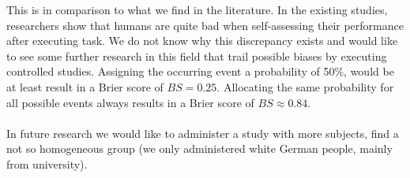 \documentclass[../main/main.tex]{subfiles}
\begin{document}
	This is in comparison to what we find in the literature. In the existing studies, researchers show that humans are quite bad when self-assessing their performance after executing task. We do not know why this discrepancy exists and would like to see some further research in this field that trail possible biases by executing controlled studies. Assigning the occurring event a probability of 50\%, would be at least result in a Brier score of $BS = 0.25$. Allocating the same probability for all possible events always results in a Brier score of $BS \approx 0.84$.
	\\\\
	In future research we would like to administer a study with more subjects, find a not so homogeneous group (we only administered white German people, mainly from university).
	
	
	
	
\end{document}
